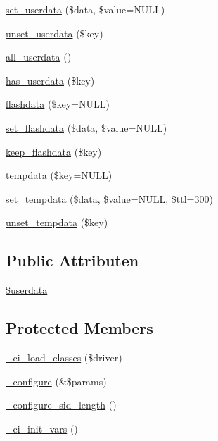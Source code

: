 \begin{DoxyCompactItemize}
\item 
\mbox{\hyperlink{class_c_i___session_a17de7d10cbbe8162d16bfc43083e74aa}{set\+\_\+userdata}} (\$data, \$value=N\+U\+LL)
\item 
\mbox{\hyperlink{class_c_i___session_a8d3a4935d2ff2088f11654445d9a0122}{unset\+\_\+userdata}} (\$key)
\item 
\mbox{\hyperlink{class_c_i___session_a974fa60ddc074b14ffcc78ef9902bc5c}{all\+\_\+userdata}} ()
\item 
\mbox{\hyperlink{class_c_i___session_a25f39652bb0f716817e5e1e778729bea}{has\+\_\+userdata}} (\$key)
\item 
\mbox{\hyperlink{class_c_i___session_acc27ddf9dd242d2c887eca2504136cff}{flashdata}} (\$key=N\+U\+LL)
\item 
\mbox{\hyperlink{class_c_i___session_a177029809f00f95b6a83cc137a45ff4e}{set\+\_\+flashdata}} (\$data, \$value=N\+U\+LL)
\item 
\mbox{\hyperlink{class_c_i___session_a1e25514ba8dbd132db06cbedc6412158}{keep\+\_\+flashdata}} (\$key)
\item 
\mbox{\hyperlink{class_c_i___session_a0bd79cb5948499f7c43adbe29f0c24a9}{tempdata}} (\$key=N\+U\+LL)
\item 
\mbox{\hyperlink{class_c_i___session_a51cac8d017a43882b365aa45745dc892}{set\+\_\+tempdata}} (\$data, \$value=N\+U\+LL, \$ttl=300)
\item 
\mbox{\hyperlink{class_c_i___session_a79d3115c19f6dfa873ca5f3a7929f24a}{unset\+\_\+tempdata}} (\$key)
\end{DoxyCompactItemize}
\subsection*{Public Attributen}
\begin{DoxyCompactItemize}
\item 
\mbox{\hyperlink{class_c_i___session_af70e594e86a310311c717b13e6ecac00}{\$userdata}}
\end{DoxyCompactItemize}
\subsection*{Protected Members}
\begin{DoxyCompactItemize}
\item 
\mbox{\hyperlink{class_c_i___session_ae4203f92a9f8a01d2498649f79acb0f9}{\+\_\+ci\+\_\+load\+\_\+classes}} (\$driver)
\item 
\mbox{\hyperlink{class_c_i___session_a71e7f49b0627505b4a7dbc8ce368279b}{\+\_\+configure}} (\&\$params)
\item 
\mbox{\hyperlink{class_c_i___session_af85033c81c047ceeec26aa087d5ba459}{\+\_\+configure\+\_\+sid\+\_\+length}} ()
\item 
\mbox{\hyperlink{class_c_i___session_a143bee24c36e5fd566b58bed89cd8463}{\+\_\+ci\+\_\+init\+\_\+vars}} ()
\end{DoxyCompactItemize}
